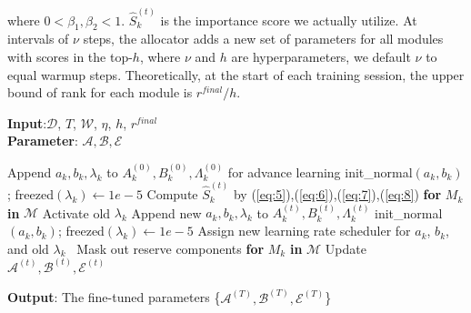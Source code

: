 where $0<\beta _1,\beta _2<1$. $\hat{S}_{k}^{\left( t \right)}$ is the importance score we actually utilize. At intervals of $\nu$ steps, the allocator adds a new set of parameters for all modules with scores in the top-$h$, where $\nu$ and $h$ are hyperparameters, we default $\nu$ to equal warmup steps. Theoretically, at the start of each training session, the upper bound of rank for each module is $r^{final} / h$.

\begin{algorithm}[ht!]
\caption{IncreLoRA. $\mathcal{D}$ is dataset, $\mathcal{M}$ is target module set, $\mathcal{A},\mathcal{B},\mathcal{E}$ is the set of parameter matrices, $T$ is total steps, $\mathcal{W}$ is warmup steps, $\eta$ is learning rate, $h$ is the number of modules selected in each round, $r^{final}$ is final total rank.}
\label{alg:algorithm}
\textbf{Input}:$\mathcal{D}$, $T$, $\mathcal{W}$, $\eta$, $h$, $r^{final}$\\
\textbf{Parameter}: $\mathcal{A},\mathcal{B},\mathcal{E}$
\begin{algorithmic}[1] 
    \STATE Append $a_k,b_k,\lambda _k$ to $A_k^{\left( 0 \right)}, B_k^{\left( 0 \right)}, \Lambda _k^{\left( 0 \right)}$ for advance learning \STATE init\_normal$\left( a_k,b_k \right)$; freezed$\left( \lambda _k \right)\gets1e-5 $ 
\ENDFOR
{} 
        \STATE Compute $\hat{S}_{k}^{\left( t \right)}$ by (\ref{eq:5}),(\ref{eq:6}),(\ref{eq:7}),(\ref{eq:8}) \textbf{for} $M_k$ \textbf{in} $\mathcal{M}$
                \STATE Activate old $\lambda_k$
                \STATE Append new $a_k,b_k,\lambda_k$ to $A_k^{\left( t \right)}, B_k^{\left( t \right)}, \Lambda _k^{\left( t \right)}$
                \STATE init\_normal$\left( a_k,b_k \right)$; freezed$\left( \lambda _k \right)\gets1e-5 $ 
                \STATE Assign new learning rate scheduler for $a_k$, $b_k$, and old $\lambda_k$
            \ENDFOR
        \ENDIF
    \
    \ELSE \STATE Mask out reserve components \textbf{for} $M_k$ \textbf{in} $\mathcal{M}$
    \ENDIF
    \STATE Update $\mathcal{A}^{\left( t \right)},\mathcal{B}^{\left( t \right)},\mathcal{E}^{\left( t \right)}$
\ENDFOR
\end{algorithmic}
\textbf{Output}: The fine-tuned parameters \{$\mathcal{A}^{\left( T \right)},\mathcal{B}^{\left( T \right)},\mathcal{E}^{\left( T \right)}$\} \\
\end{algorithm}

